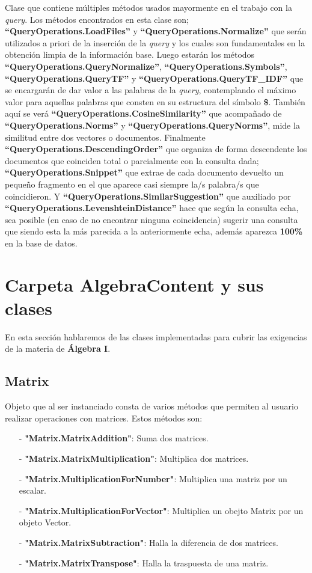 \documentclass[a4paper,12pt]{article}
\begin{document}
\begin{center}
 Clase que contiene múltiples métodos usados mayormente en el trabajo con la \emph{query}. 
 Los métodos encontrados en esta clase son; \textbf{“QueryOperations.LoadFiles”} y 
 \textbf{“QueryOperations.Normalize”} que serán utilizados a priori de la inserción de la \emph{query} y
 los cuales son fundamentales en la obtención limpia de la información base. 
 Luego estarán los métodos \textbf{“QueryOperations.QueryNormalize”},
 \textbf{“QueryOperations.Symbols”}, \textbf{“QueryOperations.QueryTF”} y 
 \textbf{“QueryOperations.QueryTF\_IDF”} que se encargarán de dar valor a las palabras de la \emph{query},
 contemplando el máximo valor para aquellas palabras que consten en su estructura del
 símbolo \textbf{\$}. También aquí se verá \textbf{“QueryOperations.CosineSimilarity”} que acompañado de
 \textbf{“QueryOperations.Norms”} y \textbf{“QueryOperations.QueryNorms”}, mide la similitud entre dos
  vectores o documentos.
 Finalmente \textbf{“QueryOperations.DescendingOrder”} que organiza de forma descendente los 
  documentos que coinciden total o parcialmente con la consulta dada; 
  \textbf{“QueryOperations.Snippet”} que extrae de cada documento devuelto un pequeño fragmento
 en el que aparece casi siempre la/s palabra/s que coincidieron. 
 Y \textbf{“QueryOperations.SimilarSuggestion”} que auxiliado por
 \textbf{“QueryOperations.LevenshteinDistance”} hace que según la consulta echa, sea posible
 (en caso de no encontrar ninguna coincidencia) sugerir una consulta que siendo esta la más
  parecida a la anteriormente echa, además aparezca \textbf{100\%} en la base de datos.


 \section{Carpeta AlgebraContent y sus clases}

 En esta sección hablaremos de las clases implementadas para cubrir las exigencias de la materia de \textbf{Álgebra I}.
 

 \subsection{Matrix}

 Objeto que al ser instanciado consta de varios métodos que permiten al usuario realizar operaciones con matrices.
 Estos métodos son:
 \begin{itemize}
    \item[-] \textbf{"Matrix.MatrixAddition"}: Suma dos matrices.
    \item[-] \textbf{"Matrix.MatrixMultiplication"}: Multiplica dos matrices.
    \item[-] \textbf{"Matrix.MultiplicationForNumber"}: Multiplica una matriz por un escalar.
    \item[-] \textbf{"Matrix.MultiplicationForVector"}: Multiplica un obejto Matrix por un objeto Vector.
    \item[-] \textbf{"Matrix.MatrixSubtraction"}: Halla la diferencia de dos matrices.
    \item[-] \textbf{"Matrix.MatrixTranspose"}: Halla la traspuesta de una matriz.
 \end{itemize}



\end{center}
\end{document}
